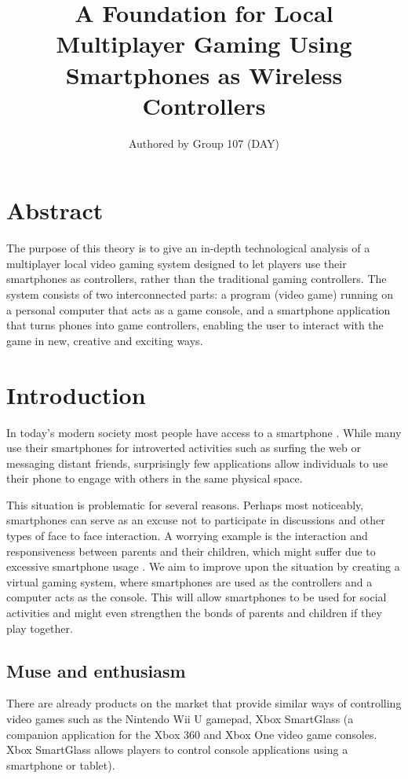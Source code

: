 \documentclass{article}
\title{A Foundation for Local Multiplayer Gaming Using Smartphones as Wireless Controllers}
\author{Authored by Group 107 (DAY)}
\date{}
\begin{document}
\maketitle
\section{Abstract}
The purpose of this theory is to give an in-depth technological analysis of a multiplayer local video gaming system designed to let players use their smartphones as controllers, rather than the traditional gaming controllers. The system consists of two interconnected parts: a program (video game) running on a personal computer that acts as a game console, and a smartphone application that turns phones into game controllers, enabling the user to interact with the game in new, creative and exciting ways.


\section{Introduction}
In today's modern society most people have access to a smartphone \cite{key:1}. While many use their
smartphones for introverted activities such as surfing the web or messaging distant friends,
surprisingly few applications allow individuals to use their phone to engage with others in the
same physical space.

This situation is problematic for several reasons. Perhaps most noticeably, smartphones can serve
as an excuse not to participate in discussions and other types of face to face interaction. A
worrying example is the interaction and responsiveness between parents and their children,
which might suffer due to excessive smartphone usage \cite{key:2}. We aim to improve upon the situation
by creating a virtual gaming system, where smartphones are used as the controllers and a
computer acts as the console. This will allow smartphones to be used for social activities and
might even strengthen the bonds of parents and children if they play together.


\subsection{Muse and enthusiasm}
There are already products on the market that provide similar ways of controlling video games such as the Nintendo Wii U gamepad, Xbox SmartGlass (a companion application for the Xbox
360 and Xbox One video game consoles. Xbox SmartGlass allows players to control console
applications using a smartphone or tablet).
\end{document}

